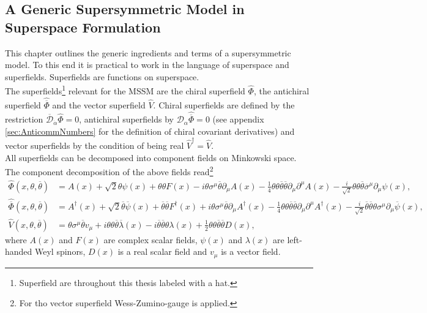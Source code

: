 \subsection{A Generic Supersymmetric Model in Superspace Formulation}
This chapter outlines the generic ingredients and terms of a supersymmetric model. To this end it is practical to work in the language of superspace and superfields. Superfields are functions on superspace.\\
The superfields\footnote{Superfield are throughout this thesis labeled with a hat.} relevant for the MSSM are the chiral superfield $\hat{\Phi}$, the antichiral superfield $\hat{\overline{\Phi}}$ and the vector superfield $\hat{V}$. Chiral superfields are defined by the restriction $\overline{\mathcal{D}}_{\dot{\alpha}}\hat{\Phi} = 0$, antichiral superfields by $\mathcal{D}_\alpha\hat{\overline{\Phi}} = 0$ (see appendix \ref{sec:AnticommNumbers} for the definition of chiral covariant derivatives) and vector superfields by the condition of being real $\hat{V}^\dagger = \hat{V}$.\\
All superfields can be decomposed into component fields on Minkowski space. The component decomposition of the above fields read\footnote{For tho vector superfield Wess-Zumino-gauge is applied.}
\begin{align}
\hat{\Phi}(x,\theta,\overline{\theta}) &= A(x) + \sqrt{2}\theta\psi(x) + \theta\theta F(x) - i\theta\sigma^\mu \overline{\theta}\partial_\mu A(x) - \frac{1}{4}\theta\theta\overline{\theta}\overline{\theta}\partial_\mu\partial^\mu A(x) - \frac{i}{\sqrt{2}}\theta\theta\overline{\theta}\overline{\sigma}^\mu \partial_\mu\psi(x),\nonumber\\
\hat{\overline{\Phi}}(x,\theta,\overline{\theta}) &= A^\dagger(x) + \sqrt{2}\overline{\theta}\overline{\psi}(x) + \overline{\theta}\overline{\theta} F^\dagger(x) + i\theta\sigma^\mu \overline{\theta}\partial_\mu A^\dagger(x) - \frac{1}{4}\theta\theta\overline{\theta}\overline{\theta}\partial_\mu\partial^\mu A^\dagger(x) - \frac{i}{\sqrt{2}}\overline{\theta}\overline{\theta}\theta\sigma^\mu \partial_\mu\overline{\psi}(x),\nonumber\\
\hat{V}(x,\theta,\overline{\theta}) &= \theta\sigma^\mu\overline{\theta} v_\mu + i\theta\theta\overline{\theta}\overline{\lambda}(x) -i \overline{\theta}\overline{\theta}\theta\lambda(x) + \frac{1}{2}\theta\theta\overline{\theta}\overline{\theta}D(x),\label{eq:superfielddecomp}
\end{align}
where $A(x)$ and $F(x)$ are complex scalar fields, $\psi(x)$ and $\lambda(x)$ are left-handed Weyl spinors, $D(x)$ is a real scalar field and $v_\mu$ is a vector field.\\

